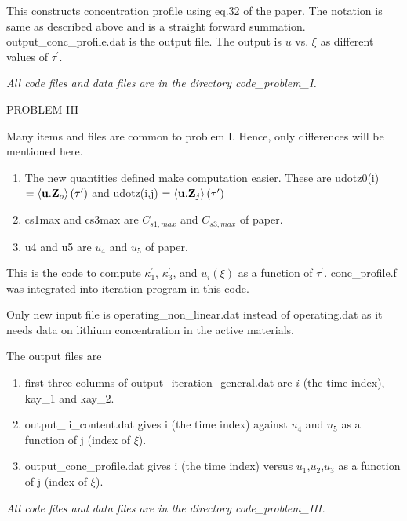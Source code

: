 \documentclass[a4paper,11pt]{article}
\begin{document}
\vspace{.1in}

This constructs concentration profile using eq.32 of the paper. The
notation is same as described above and is a straight forward
summation. output\_conc\_profile.dat is the output file. The output is
$u$ vs. $\xi$ as different values of $\tau^\prime$.
\vspace{0.1in}

{\it All code files and data files are in the directory code\_problem\_I.}
\begin{center}
  PROBLEM III
\end{center}
Many items and files are common to problem I. Hence, only differences
will be mentioned here.
\begin{enumerate}
\item The new quantities defined make computation easier. These are
  udotz0(i) $=\left<{\bf u.Z}_o\right>(\tau^\prime)$ and udotz(i,j) $=\left<{\bf u.Z}_j\right>(\tau^\prime) $
\item cs1max and cs3max are $C_{s1,max}$ and $C_{s3,max}$ of paper.
  \item u4 and u5 are $u_4$ and $u_5$ of paper.
\end{enumerate}
\vspace{.1in}

This is the code to compute $\kappa_1^\prime$, $\kappa_3^\prime$, and $u_i(\xi)$
as a function of $\tau^\prime$.  conc\_profile.f was integrated into
iteration program in this code.

Only new input file is operating\_non\_linear.dat instead of
operating.dat as it needs data on lithium concentration in the active
materials. 

The output files are
\begin{enumerate}
  \item first three columns of output\_iteration\_general.dat are $i$
  (the time index),  kay\_1 and kay\_2.
  \item output\_li\_content.dat gives i (the time index) against
    $u_4$ and $u_5$  as a function of j
    (index of $\xi$).   
\item output\_conc\_profile.dat gives i (the time index) versus
  $u_1$,$u_2$,$u_3$ as a function of  j
  (index of $\xi$).
\end{enumerate}

{\it All code files and data files are in the directory code\_problem\_III.}
\end{document}
